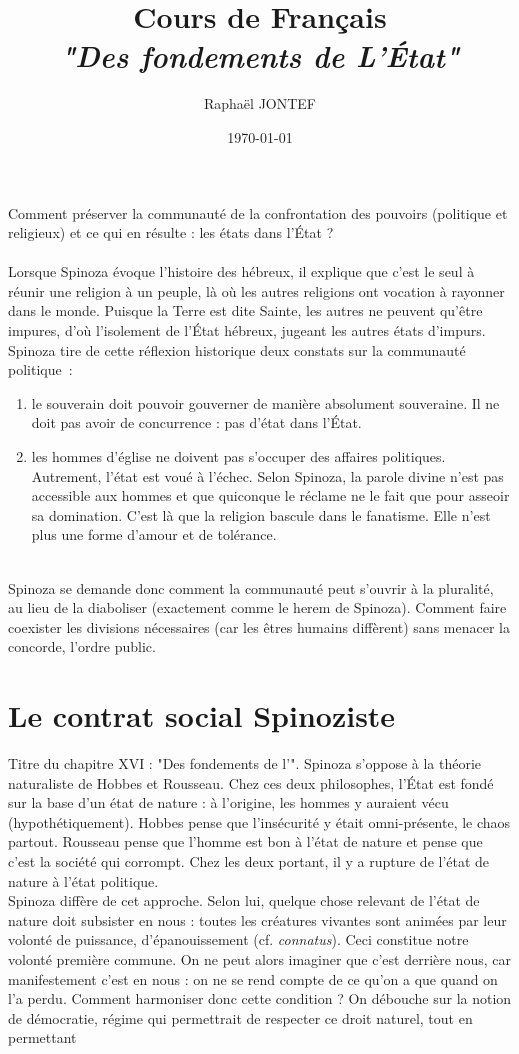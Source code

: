 \documentclass[a4paper,12pt]{article}
\title{Cours de Français\\ \Large \textit{"Des fondements de L'État"}}
\author{Raphaël JONTEF}
\date{\today}
\begin{document}
\maketitle
Comment préserver la communauté de la confrontation des pouvoirs (politique et religieux) et ce qui en résulte : les états dans l'État ?\\\\

Lorsque Spinoza évoque l'histoire des hébreux, il explique que c'est le seul à réunir une religion à un peuple, là où les autres religions ont vocation à rayonner dans le monde. Puisque la Terre est dite Sainte, les autres ne peuvent qu'être impures, d'où l'isolement de l'État hébreux, jugeant les autres états d'impurs. Spinoza tire de cette réflexion historique deux constats sur la communauté politique~:
\begin{enumerate}
    \item le souverain doit pouvoir gouverner de manière absolument souveraine. Il ne doit pas avoir de concurrence : pas d'état dans l'État.
    \item les hommes d'église ne doivent pas s'occuper des affaires politiques. Autrement, l'état est voué à l'échec. Selon Spinoza, la parole divine n'est pas accessible aux hommes et que quiconque le réclame ne le fait que pour asseoir sa domination. C'est là que la religion bascule dans le fanatisme. Elle n'est plus une forme d'amour et de tolérance.
\end{enumerate}
\\
Spinoza se demande donc comment la communauté peut s'ouvrir à la pluralité, au lieu de la diaboliser (exactement comme le herem de Spinoza). Comment faire coexister les divisions nécessaires (car les êtres humains diffèrent) sans menacer la concorde, l'ordre public.

\section{Le contrat social Spinoziste}

Titre du chapitre XVI : "Des fondements de l'". Spinoza s'oppose à la théorie naturaliste de Hobbes et Rousseau. Chez ces deux philosophes, l'État est fondé sur la base d'un état de nature : à l'origine, les hommes y auraient vécu (hypothétiquement). Hobbes pense que l'insécurité y était omni-présente, le chaos partout. Rousseau pense que l'homme est bon à l'état de nature et pense que c'est la société qui corrompt. Chez les deux portant, il y a rupture de l'état de nature à l'état politique. \\
Spinoza diffère de cet approche. Selon lui, quelque chose relevant de l'état de nature doit subsister en nous : toutes les créatures vivantes sont animées par leur volonté de puissance, d'épanouissement (cf. \textit{connatus}). Ceci constitue notre volonté première commune. On ne peut alors imaginer que c'est derrière nous, car manifestement c'est en nous : on ne se rend compte de ce qu'on a que quand on l'a perdu. Comment harmoniser donc cette condition ? On débouche sur la notion de démocratie, régime qui permettrait de respecter ce droit naturel, tout en permettant 
\end{document}
